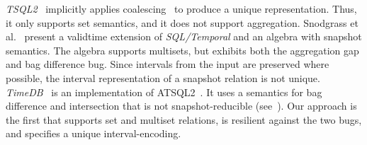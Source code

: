%
\emph{TSQL2}~\cite{Snodgrass95,DBLP:journals/sigmod/SnodgrassAABCDEGJKKKLLRSSS94,SJ95}
implicitly applies coalescing~\cite{DBLP:conf/vldb/BohlenSS96} to
produce a unique representation. Thus, it only supports  set semantics,
and it does not support aggregation.
%
Snodgrass et al.~\cite{SB96} present a validtime extension of
\emph{SQL/Temporal} and an algebra with snapshot semantics. The
algebra supports multisets, but exhibits both the aggregation gap and
bag difference bug. Since intervals from the input are preserved
where possible, the interval representation of a snapshot
relation is not unique.
%
\emph{TimeDB}~\cite{S98} is an implementation of
ATSQL2~\cite{Bohlen95evaluatingand}. It uses a semantics for bag
difference and intersection that is not snapshot-reducible
(see~\cite[pp.\ 63]{S98}).
%
 Our approach is the first that supports set and multiset relations,
 is resilient against the two bugs, and specifies a unique
 interval-encoding. %


